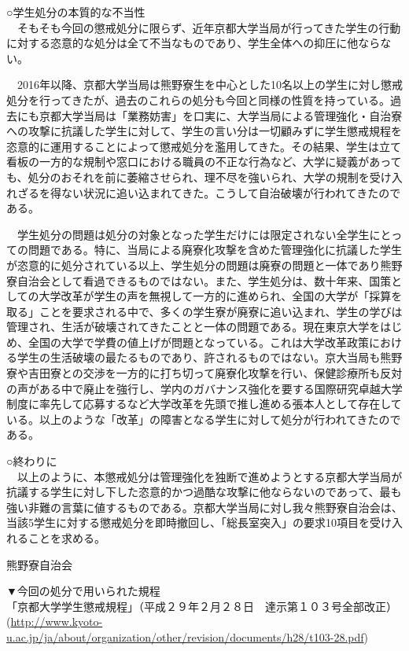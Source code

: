 {\begin{tcolorbox}[colback=white, colbacktitle=gray!30!white, coltitle=black, title=2024年9月25日付で京大生5名に下された懲戒処分に対する抗議声明,breakable]
\noindent ○学生処分の本質的な不当性\\
　そもそも今回の懲戒処分に限らず、近年京都大学当局が行ってきた学生の行動に対する恣意的な処分は全て不当なものであり、学生全体への抑圧に他ならない。

　2016年以降、京都大学当局は熊野寮生を中心とした10名以上の学生に対し懲戒処分を行ってきたが、過去のこれらの処分も今回と同様の性質を持っている。過去にも京都大学当局は「業務妨害」を口実に、大学当局による管理強化・自治寮への攻撃に抗議した学生に対して、学生の言い分は一切顧みずに学生懲戒規程を恣意的に運用することによって懲戒処分を濫用してきた。その結果、学生は立て看板の一方的な規制や窓口における職員の不正な行為など、大学に疑義があっても、処分のおそれを前に萎縮させられ、理不尽を強いられ、大学の規制を受け入れざるを得ない状況に追い込まれてきた。こうして自治破壊が行われてきたのである。

　学生処分の問題は処分の対象となった学生だけには限定されない全学生にとっての問題である。特に、当局による廃寮化攻撃を含めた管理強化に抗議した学生が恣意的に処分されている以上、学生処分の問題は廃寮の問題と一体であり熊野寮自治会として看過できるものではない。また、学生処分は、数十年来、国策としての大学改革が学生の声を無視して一方的に進められ、全国の大学が「採算を取る」ことを要求される中で、多くの学生寮が廃寮に追い込まれ、学生の学びは管理され、生活が破壊されてきたことと一体の問題である。現在東京大学をはじめ、全国の大学で学費の値上げが問題となっている。これは大学改革政策における学生の生活破壊の最たるものであり、許されるものではない。京大当局も熊野寮や吉田寮との交渉を一方的に打ち切って廃寮化攻撃を行い、保健診療所も反対の声がある中で廃止を強行し、学内のガバナンス強化を要する国際研究卓越大学制度に率先して応募するなど大学改革を先頭で推し進める張本人として存在している。以上のような「改革」の障害となる学生に対して処分が行われてきたのである。

\noindent ○終わりに\\
　以上のように、本懲戒処分は管理強化を独断で進めようとする京都大学当局が抗議する学生に対し下した恣意的かつ過酷な攻撃に他ならないのであって、最も強い非難の言葉に値するものである。京都大学当局に対し我々熊野寮自治会は、当該5学生に対する懲戒処分を即時撤回し、「総長室突入」の要求10項目を受け入れることを求める。

熊野寮自治会

\vspace{5mm}
\noindent ▼今回の処分で用いられた規程\\
「京都大学学生懲戒規程」（平成２９年２月２８日　達示第１０３号全部改正）
(\url{http://www.kyoto-u.ac.jp/ja/about/organization/other/revision/documents/h28/t103-28.pdf})


\end{tcolorbox}
}

